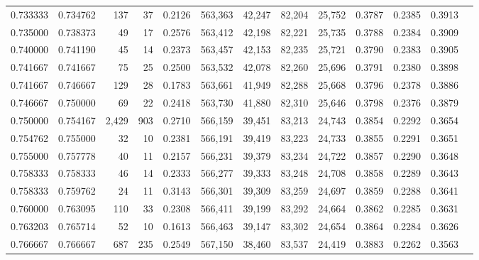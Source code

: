 \begin{tabular}{rrrrrrrrrrrrr}
0.733333 & 0.734762 &    137 &     37 &                                     0.2126 & 563,363 &  42,247 &  82,204 &  25,752 & 0.3787 & 0.2385 & 0.3913 \\
0.735000 & 0.738373 &     49 &     17 &                                     0.2576 & 563,412 &  42,198 &  82,221 &  25,735 & 0.3788 & 0.2384 & 0.3909 \\
0.740000 & 0.741190 &     45 &     14 &                                     0.2373 & 563,457 &  42,153 &  82,235 &  25,721 & 0.3790 & 0.2383 & 0.3905 \\
0.741667 & 0.741667 &     75 &     25 &                                     0.2500 & 563,532 &  42,078 &  82,260 &  25,696 & 0.3791 & 0.2380 & 0.3898 \\
0.741667 & 0.746667 &    129 &     28 &                                     0.1783 & 563,661 &  41,949 &  82,288 &  25,668 & 0.3796 & 0.2378 & 0.3886 \\
0.746667 & 0.750000 &     69 &     22 &                                     0.2418 & 563,730 &  41,880 &  82,310 &  25,646 & 0.3798 & 0.2376 & 0.3879 \\
0.750000 & 0.754167 &  2,429 &    903 &                                     0.2710 & 566,159 &  39,451 &  83,213 &  24,743 & 0.3854 & 0.2292 & 0.3654 \\
0.754762 & 0.755000 &     32 &     10 &                                     0.2381 & 566,191 &  39,419 &  83,223 &  24,733 & 0.3855 & 0.2291 & 0.3651 \\
0.755000 & 0.757778 &     40 &     11 &                                     0.2157 & 566,231 &  39,379 &  83,234 &  24,722 & 0.3857 & 0.2290 & 0.3648 \\
0.758333 & 0.758333 &     46 &     14 &                                     0.2333 & 566,277 &  39,333 &  83,248 &  24,708 & 0.3858 & 0.2289 & 0.3643 \\
0.758333 & 0.759762 &     24 &     11 &                                     0.3143 & 566,301 &  39,309 &  83,259 &  24,697 & 0.3859 & 0.2288 & 0.3641 \\
0.760000 & 0.763095 &    110 &     33 &                                     0.2308 & 566,411 &  39,199 &  83,292 &  24,664 & 0.3862 & 0.2285 & 0.3631 \\
0.763203 & 0.765714 &     52 &     10 &                                     0.1613 & 566,463 &  39,147 &  83,302 &  24,654 & 0.3864 & 0.2284 & 0.3626 \\
0.766667 & 0.766667 &    687 &    235 &                                     0.2549 & 567,150 &  38,460 &  83,537 &  24,419 & 0.3883 & 0.2262 & 0.3563 \\

\end{tabular}
